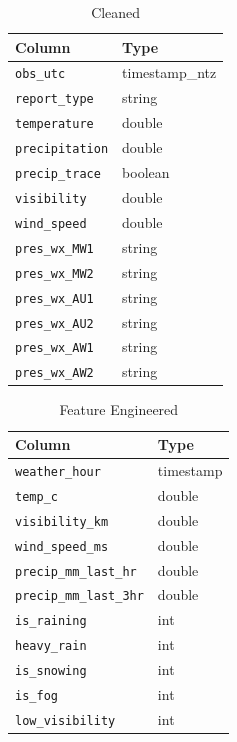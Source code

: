 \documentclass[11pt]{article}
\newcommand{\col}[1]{\texttt{#1}}
\begin{document}
\begin{table}[H]
\centering
\caption{Cleaned}
\begin{tabular}{ll}
\toprule
Column & Type \\
\midrule
\col{obs\_utc} & timestamp\_ntz \\
\col{report\_type} & string \\
\col{temperature} & double \\
\col{precipitation} & double \\
\col{precip\_trace} & boolean \\
\col{visibility} & double \\
\col{wind\_speed} & double \\
\col{pres\_wx\_MW1} & string \\
\col{pres\_wx\_MW2} & string \\
\col{pres\_wx\_AU1} & string \\
\col{pres\_wx\_AU2} & string \\
\col{pres\_wx\_AW1} & string \\
\col{pres\_wx\_AW2} & string \\
\bottomrule
\end{tabular}
\end{table}

\begin{table}[H]
\centering
\caption{Feature Engineered}
\begin{tabular}{ll}
\toprule
Column & Type \\
\midrule
\col{weather\_hour} & timestamp \\
\col{temp\_c} & double \\
\col{visibility\_km} & double \\
\col{wind\_speed\_ms} & double \\
\col{precip\_mm\_last\_hr} & double \\
\col{precip\_mm\_last\_3hr} & double \\
\col{is\_raining} & int \\
\col{heavy\_rain} & int \\
\col{is\_snowing} & int \\
\col{is\_fog} & int \\
\col{low\_visibility} & int \\
\bottomrule
\end{tabular}
\end{table}
\end{document}
